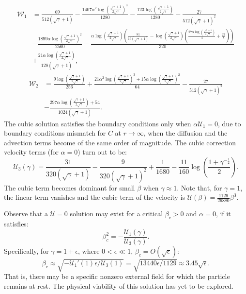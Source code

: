 \documentclass[preprint,10pt]{elsarticle}
\newcommand\eps \epsilon
\newcommand{\pars}[1]{\left(#1\right)}
\newcommand\cU{\mathscr{U}}
\newcommand\cW{\mathscr{W}}
\begin{document}
\begin{align*}
\cW_1 &= \frac{69}{512 \left(\sqrt{\gamma} + 1\right)} - \frac{1407\alpha^2 {\log\left(\frac{\sqrt{\gamma} + 1}{2 \sqrt{\gamma}}\right)}^3}{1280} - \frac{123 \log\left(\frac{\sqrt{\gamma} + 1}{2 \sqrt{\gamma}}\right)}{1280} - \frac{27}{512 {\left(\sqrt{\gamma} + 1\right)}^2} 
\\ & -\frac{1899\alpha {\log\left(\frac{\sqrt{\gamma} + 1}{2 \sqrt{\gamma}}\right)}^2}{2560} 
- \frac{\alpha \log\left(\frac{\sqrt{\gamma} + 1}{2 \sqrt{\gamma}}\right) \left(\frac{81}{16 \left(\sqrt{\gamma} + 1\right)} - \log\left(\frac{\sqrt{\gamma} + 1}{2 \sqrt{\gamma}}\right) \left(\frac{27\alpha \log\left(\frac{\sqrt{\gamma} + 1}{2 \sqrt{\gamma}}\right)}{4} + \frac{27}{8}\right)\right)}{320} 
\\ & + \frac{21\alpha \log\left(\frac{\sqrt{\gamma} + 1}{2 \sqrt{\gamma}}\right)}{128 \left(\sqrt{\gamma} + 1\right)},
\end{align*}
\begin{align*}
\cW_2 &= \frac{9 \log\left(\frac{\sqrt{\gamma} + 1}{2 \sqrt{\gamma}}\right)}{256} 
+ \frac{21\alpha^2 {\log\left(\frac{\sqrt{\gamma} + 1}{2 \sqrt{\gamma}}\right)}^3 + 
15\alpha {\log\left(\frac{\sqrt{\gamma} + 1}{2 \sqrt{\gamma}}\right)}^2}{64} 
- \frac{27}{512 {\left(\sqrt{\gamma} + 1\right)}^2}
\\ \nonumber &
- \frac{297\alpha \log\left(\frac{\sqrt{\gamma} + 1}{2 \sqrt{\gamma}}\right) + 54}{1024 \left(\sqrt{\gamma} + 1\right)}.
\end{align*}
The cubic solution satisfies the boundary conditions only when $\alpha\cU_1 = 0$,
due to boundary conditions mismatch for $C$ at $r \rightarrow \infty$, when
the diffusion and the advection terms become of the same order of magnitude.
The cubic correction velocity terms (for $\alpha = 0$)
turn out to be:
\begin{equation}
\cU_3(\gamma) = \frac{31}{320(\sqrt\gamma + 1)} - \frac{9}{320(\sqrt\gamma + 1)^2} + \frac{1}{1680} - \frac{11}{160} \log \pars{\frac{1 + \gamma^{-\frac{1}{2}}}{2}}.
\end{equation}
The cubic term becomes dominant for small $\beta$ when $\gamma \approx 1$.
Note that, for $\gamma = 1$, the linear term vanishes and the cubic term 
of the velocity is $\cU(\beta) = \frac{1129}{26880}\beta^3$.

Observe that a $\cU = 0$ solution may exist for a critical $\beta_c > 0$ and $\alpha = 0$, 
if it satisfies:
\begin{equation} \label{eq:crit_beta}
\beta_c^2 = -\frac{\cU_1(\gamma)}{\cU_3(\gamma)}.
\end{equation}
Specifically, for $\gamma = 1 + \eps$, where $0 < \eps \ll 1$, $\beta_c = O\pars{\sqrt{\eps}}$:
\begin{equation}
\beta_c \approx \sqrt{-{\cU_1'(1) \eps}/{\cU_3(1)}} = 
 \sqrt{{13440 \eps}/{1129}} \approx 3.45 \sqrt{\eps}.
\end{equation}
That is, there may be a specific nonzero external field for which the particle remains at rest. The physical viability of this solution has yet to be explored.

\clearpage
{}



\end{document}
